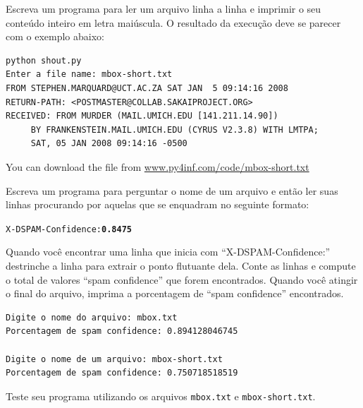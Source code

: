 \begin{ex}
Escreva um programa para ler um arquivo linha a linha e imprimir
o seu conteúdo inteiro em letra maiúscula. O resultado da execução
deve se parecer com o exemplo abaixo:

\beforeverb
\begin{verbatim}
python shout.py
Enter a file name: mbox-short.txt
FROM STEPHEN.MARQUARD@UCT.AC.ZA SAT JAN  5 09:14:16 2008
RETURN-PATH: <POSTMASTER@COLLAB.SAKAIPROJECT.ORG>
RECEIVED: FROM MURDER (MAIL.UMICH.EDU [141.211.14.90])
	 BY FRANKENSTEIN.MAIL.UMICH.EDU (CYRUS V2.3.8) WITH LMTPA;
	 SAT, 05 JAN 2008 09:14:16 -0500
\end{verbatim}
\afterverb
%
You can download the file from
\url{www.py4inf.com/code/mbox-short.txt}
\end{ex}

\begin{ex}
Escreva um programa para perguntar o nome de um arquivo e então
ler suas linhas procurando por aquelas que se enquadram no seguinte
formato:

\beforeverb
\begin{alltt}
X-DSPAM-Confidence: {\bf 0.8475}
\end{alltt}
\afterverb

Quando você encontrar uma linha que inicia com
``X-DSPAM-Confidence:'' destrinche a linha para extrair
o ponto flutuante dela. Conte as linhas e compute o total
de valores ``spam confidence'' que forem encontrados. Quando
você atingir o final do arquivo, imprima a porcentagem de 
``spam confidence'' encontrados.

\beforeverb
\begin{verbatim}
Digite o nome do arquivo: mbox.txt
Porcentagem de spam confidence: 0.894128046745

Digite o nome de um arquivo: mbox-short.txt
Porcentagem de spam confidence: 0.750718518519
\end{verbatim}
\afterverb
%

Teste seu programa utilizando os arquivos {\tt mbox.txt} e {\tt mbox-short.txt}.
\end{ex}


